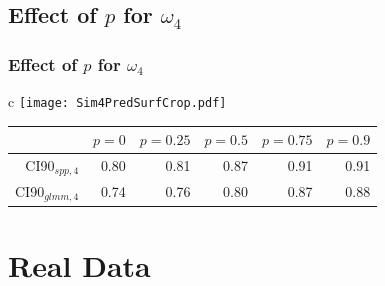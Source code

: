 \documentclass[mathserif,compress]{beamer}
\begin{document}

\subsection{Effect of $p$ for $\omega_4$}
\begin{frame}
\frametitle{Effect of $p$ for $\omega_4$}

	\vspace{.1 cm}
	\begin{tabular}{c}
			\texttt{[image: Sim4PredSurfCrop.pdf]} \\
		\vspace{1 cm}
		{
			\begin{tabular}{rrrrrr}
				\hline
				& $p = 0$ & $p=0.25$ & $p = 0.5$ & $p = 0.75$ & $p = 0.9$ \\ 
				\hline
				CI90$_{spp,4}$ & 0.80 & 0.81 & 0.87 & 0.91 & 0.91 \\ 
				CI90$_{glmm,4}$ & 0.74 & 0.76 & 0.80 & 0.87 & 0.88 \\ 
			\end{tabular}
		}
	\end{tabular}
\end{frame}


\section{Real Data}
\end{document}
